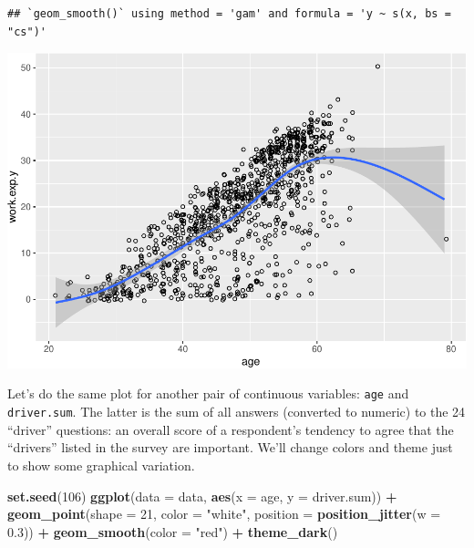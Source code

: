 \documentclass[
]{book}
\newenvironment{Shaded}{\begin{snugshade}}{\end{snugshade}}
\newcommand{\AttributeTok}[1]{\textcolor[rgb]{0.13,0.29,0.53}{#1}}
\newcommand{\DecValTok}[1]{\textcolor[rgb]{0.00,0.00,0.81}{#1}}
\newcommand{\FloatTok}[1]{\textcolor[rgb]{0.00,0.00,0.81}{#1}}
\newcommand{\FunctionTok}[1]{\textcolor[rgb]{0.13,0.29,0.53}{\textbf{#1}}}
\newcommand{\NormalTok}[1]{#1}
\newcommand{\SpecialCharTok}[1]{\textcolor[rgb]{0.81,0.36,0.00}{\textbf{#1}}}
\newcommand{\StringTok}[1]{\textcolor[rgb]{0.31,0.60,0.02}{#1}}
\begin{document}
\begin{verbatim}
## `geom_smooth()` using method = 'gam' and formula = 'y ~ s(x, bs = "cs")'
\end{verbatim}

\includegraphics{R-for-social-research-and-business-analytics_files/figure-latex/unnamed-chunk-32-1.pdf}

Let's do the same plot for another pair of continuous variables: \texttt{age} and \texttt{driver.sum}. The latter is the sum of all answers (converted to numeric) to the 24 ``driver'' questions: an overall score of a respondent's tendency to agree that the ``drivers'' listed in the survey are important. We'll change colors and theme just to show some graphical variation.

\begin{Shaded}
\begin{Highlighting}[]
\FunctionTok{set.seed}\NormalTok{(}\DecValTok{106}\NormalTok{)}
\FunctionTok{ggplot}\NormalTok{(}\AttributeTok{data =}\NormalTok{ data, }\FunctionTok{aes}\NormalTok{(}\AttributeTok{x =}\NormalTok{ age, }\AttributeTok{y =}\NormalTok{ driver.sum)) }\SpecialCharTok{+}
  \FunctionTok{geom\_point}\NormalTok{(}\AttributeTok{shape =} \DecValTok{21}\NormalTok{, }\AttributeTok{color =} \StringTok{"white"}\NormalTok{, }\AttributeTok{position =} \FunctionTok{position\_jitter}\NormalTok{(}\AttributeTok{w =} \FloatTok{0.3}\NormalTok{)) }\SpecialCharTok{+}
  \FunctionTok{geom\_smooth}\NormalTok{(}\AttributeTok{color =} \StringTok{"red"}\NormalTok{) }\SpecialCharTok{+}
  \FunctionTok{theme\_dark}\NormalTok{()}
\end{Highlighting}
\end{Shaded}
\end{document}
